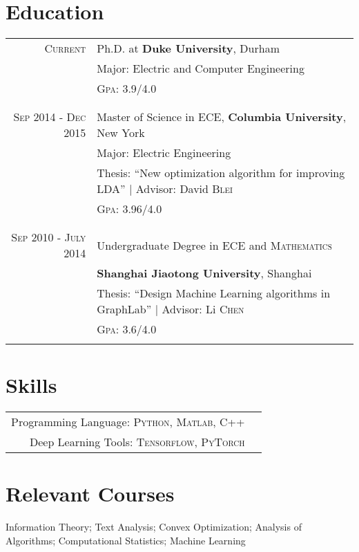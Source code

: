 \documentclass[a4paper,10pt]{article}
\begin{document}
\section{Education}
\begin{tabular}{r|p{11cm}}
\textsc{Current} & Ph.D. at \textbf{Duke University}, Durham\\
& Major: Electric and Computer Engineering\\
&\textsc{Gpa}: 3.9/4.0 \\&\\
\multicolumn{2}{c}{} \\
 \small{\textsc{Sep} 2014 - \textsc{Dec} 2015} & Master of Science in \textsc{ECE}, \textbf{Columbia University}, New York\\
& Major: Electric Engineering\\
& \small Thesis: ``New optimization algorithm for improving LDA'' | \small Advisor: David \textsc{Blei}\\
&\normalsize \textsc{Gpa}: 3.96/4.0\\&\\
\multicolumn{2}{c}{} \\
\small{\textsc{Sep} 2010 - \textsc{July} 2014}& Undergraduate Degree in \textsc{ECE} and \textsc{Mathematics} \\ &\normalsize\textbf{Shanghai Jiaotong University}, Shanghai\\
& \small Thesis: ``Design Machine Learning algorithms in GraphLab'' | \small Advisor: Li \textsc{Chen}\\
&\normalsize \textsc{Gpa}: 3.6/4.0\\&\\
\end{tabular}

\section{Skills}
\begin{tabular}{rl}
    Programming Language: \textsc{Python}, \textsc{Matlab}, \textsc{C++}\\
    Deep Learning Tools: \textsc{Tensorflow}, \textsc{PyTorch}
\end{tabular}

\section{Relevant Courses}
\small Information Theory; Text Analysis; Convex Optimization; Analysis of Algorithms; Computational Statistics; Machine Learning 
\end{document}
